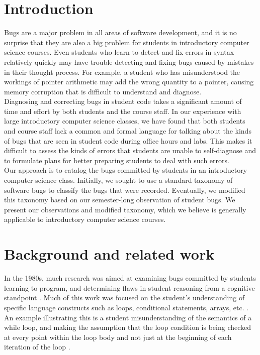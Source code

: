 \documentclass{sig-alternate}
\begin{document}
\section{Introduction}
\label{sec:intro}

Bugs are a major problem in all areas of software development, and it
is no surprise that they are also a big problem for students in
introductory computer science courses. Even students who learn to
detect and fix errors in syntax relatively quickly may have trouble detecting and fixing bugs caused by mistakes in their thought process. For example, a student who has misunderstood the workings of pointer arithmetic may add the wrong quantity to a pointer, causing memory corruption that is difficult to understand and diagnose.\\

Diagnosing and correcting bugs in student code takes a significant
amount of time and effort by both students and the course staff. In our experience with large introductory computer science classes, we have found that both students and course staff lack a common and formal language for talking about the kinds of bugs that are seen in student code during office hours and labs. This makes it difficult to assess the kinds of errors that students are unable to self-diagnose and to formulate plans for better preparing students to
deal with such errors.\\

Our approach is to catalog the bugs committed by students in an introductory computer science class. Initially, we sought to use a standard taxonomy of software bugs \cite{IEEE10} to classify the bugs that were recorded. Eventually, we modified this taxonomy based on our semester-long observation of student bugs. We present our observations and modified taxonomy, which we believe is generally applicable to introductory computer science courses.

\section{Background and related work}
\label{sec:background}

In the 1980s, much research was aimed at examining bugs committed by students learning to program, and determining flaws in student reasoning from a cognitive standpoint \cite{JoniSolowayGoldmanEhrlich83, PutnamSleemanBaxterKuspa86, SpohrerSoloway86, Pea86}. Much of this work was focused on the student's understanding of specific language constructs such as loops, conditional statements, arrays, etc. \cite{JoniSolowayGoldmanEhrlich83, PutnamSleemanBaxterKuspa86, Pea86}. An example illustrating this is a student misunderstanding of the semantics of a while loop, and making the assumption that the loop condition is being checked at every point within the loop body and not just at the beginning of each iteration of the loop \cite{Pea86}.\\
\end{document}
